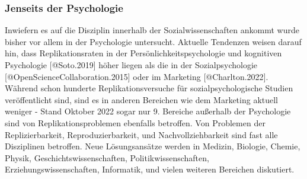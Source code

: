 \documentclass[
  letterpaper,
  DIV=11,
  numbers=noendperiod]{scrreprt}
\begin{document}
\subsubsection{Jenseits der Psychologie}\label{jenseits-der-psychologie}

Inwiefern es auf die Disziplin innerhalb der Sozialwissenschaften
ankommt wurde bisher vor allem in der Psychologie untersucht. Aktuelle
Tendenzen weisen darauf hin, dass Replikationsraten in der
Persönlichkeitspsychologie und kognitiven Psychologie {[}@Soto.2019{]}
höher liegen als die in der Sozialpsychologie
{[}@OpenScienceCollaboration.2015{]} oder im Marketing
{[}@Charlton.2022{]}. Während schon hunderte Replikationsversuche für
sozialpsychologische Studien veröffentlicht sind, sind es in anderen
Bereichen wie dem Marketing aktuell weniger - Stand Oktober 2022 sogar
nur 9. Bereiche außerhalb der Psychologie sind von Replikationsproblemen
ebenfalls betroffen. Von Problemen der Replizierbarkeit,
Reproduzierbarkeit, und Nachvollziehbarkeit sind fast alle Disziplinen
betroffen. Neue Lösungsansätze werden in Medizin, Biologie, Chemie,
Physik, Geschichtswissenschaften, Politikwissenschaften,
Erziehungswissenschaften, Informatik, und vielen weiteren Bereichen
diskutiert.
\end{document}
